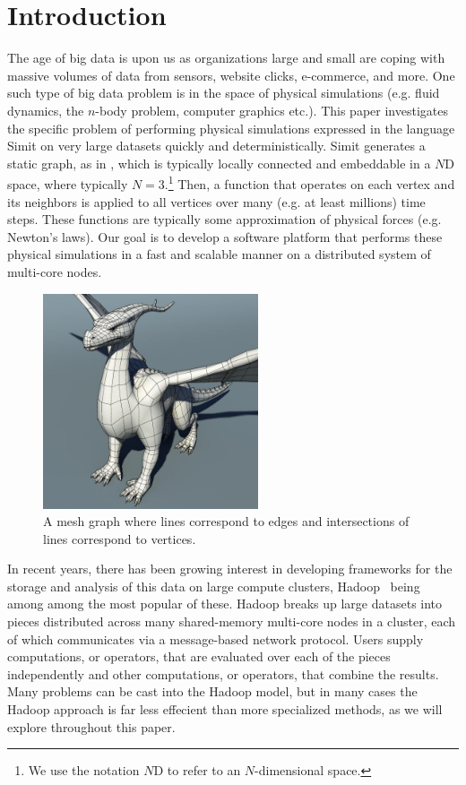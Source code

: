 \section{Introduction}
\label{sec:intro}



The age of {\large big data} is upon us as organizations large and small 
are coping with massive volumes of data from sensors, website 
clicks, e-commerce, and more. One such type of big data
problem is in the space of physical simulations (e.g. fluid dynamics,
the $n$-body problem, computer graphics etc.).  This paper investigates 
the specific problem of performing physical simulations
expressed in the language Simit on very large datasets quickly and
deterministically.  Simit generates a static graph, as in , 
which is typically
locally connected and embeddable in a $N$D space, where typically
$N=3$.\footnote{We use the notation $N$D to refer to an $N$-dimensional
space.}  Then, a function that operates on each vertex and its neighbors 
is applied to all vertices over many (e.g. at least millions) time steps.
These functions are typically some approximation of physical forces (e.g.
Newton's laws).  Our goal is to develop a software platform that performs these
physical simulations in a fast and scalable manner on a distributed system of 
multi-core nodes.

\begin{figure}
\centering
\includegraphics[width=2.5in]{figures/dragon}
\caption{A mesh graph where lines correspond to edges and intersections of lines correspond to vertices.}
\label{fig:mesh}
\end{figure}



In recent years, there has been 
growing interest in developing frameworks for the storage and 
analysis of this data on large compute clusters, 
Hadoop~\cite{CuttingCa05,DeanGh08} being among among the most 
popular of these. Hadoop breaks up 
large datasets into pieces distributed across many shared-memory
multi-core nodes in a cluster, each of which communicates via
a message-based network protocol. Users supply computations, 
or  operators, that are evaluated over each of 
the pieces independently and other computations, or  
operators, that combine the results. 
Many problems can be cast into the Hadoop model, but in many 
cases the Hadoop approach is far less effecient than more 
specialized methods, as we will explore throughout this paper.


